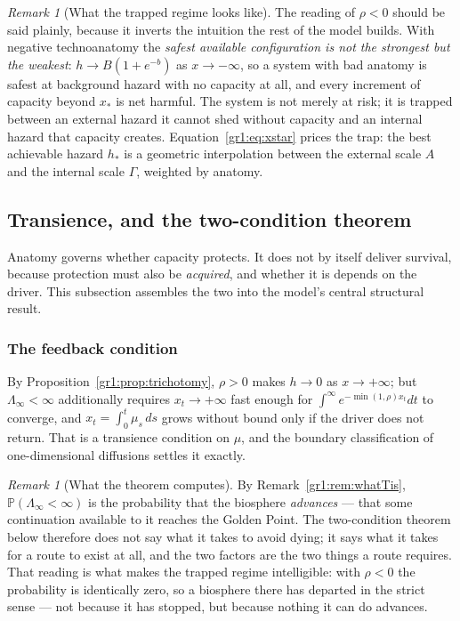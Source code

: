 \documentclass[11pt]{article}
\numberwithin{equation}{section}
\theoremstyle{plain}
\theoremstyle{definition}
\theoremstyle{remark}
\newtheorem{remark}[theorem]{Remark}
\newcommand{\PP}{\mathbb{P}}
\begin{document}
\begin{remark}[What the trapped regime looks like]
\label{gr1:rem:trapped}
The reading of $\rho<0$ should be said plainly, because it inverts the
intuition the rest of the model builds. With negative technoanatomy the
\emph{safest available configuration is not the strongest but the
weakest}: $h\to B(1+e^{-b})$ as $x\to-\infty$, so a system with bad
anatomy is safest at background hazard with no capacity at all, and
every increment of capacity beyond $x_\ast$ is net harmful. The system
is not merely at risk; it is trapped between an external hazard it
cannot shed without capacity and an internal hazard that capacity
creates. Equation~\eqref{gr1:eq:xstar} prices the trap: the best
achievable hazard $h_\ast$ is a geometric interpolation between the
external scale $A$ and the internal scale $\Gamma$, weighted by anatomy.
\end{remark}


\subsection{Transience, and the two-condition theorem}
\label{gr1:sub:twocond}

Anatomy governs whether capacity protects. It does not by itself deliver
survival, because protection must also be \emph{acquired}, and whether
it is depends on the driver. This subsection assembles the two into the
model's central structural result.

\subsubsection{The feedback condition}\label{gr1:subsub:feedback}

By Proposition~\ref{gr1:prop:trichotomy}, $\rho>0$ makes $h\to0$ as
$x\to+\infty$; but $\Lambda_\infty<\infty$ additionally requires
$x_t\to+\infty$ fast enough for $\int^\infty e^{-\min(1,\rho)x_t}dt$ to
converge, and $x_t=\int_0^t\mu_s\,ds$ grows without bound only if the
driver does not return. That is a transience condition on $\mu$, and
the boundary classification of one-dimensional diffusions settles it
exactly.

\begin{remark}[What the theorem computes]\label{gr1:rem:twocondreading}
By Remark~\ref{gr1:rem:whatTis}, $\PP(\Lambda_\infty<\infty)$ is the
probability that the biosphere \emph{advances} --- that some
continuation available to it reaches the Golden Point. The
two-condition theorem below therefore does not say what it takes to
avoid dying; it says what it takes for a route to exist at all, and the
two factors are the two things a route requires. That reading is what
makes the trapped regime intelligible: with $\rho<0$ the probability is
identically zero, so a biosphere there has departed in the strict
sense --- not because it has stopped, but because nothing it can do
advances.
\end{remark}
\end{document}
